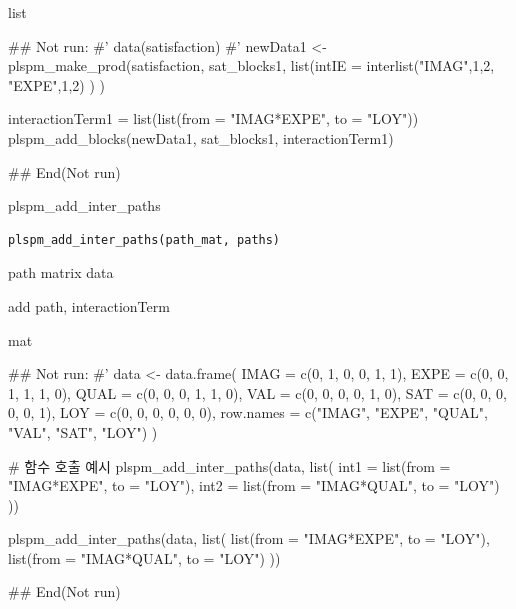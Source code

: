 \documentclass[a4paper]{book}
\begin{document}
%
\begin{Value}
list
\end{Value}
%
\begin{Examples}
\begin{ExampleCode}
## Not run: 
#' data(satisfaction)
#'
newData1 <- plspm_make_prod(satisfaction, sat_blocks1,
                            list(intIE = interlist("IMAG",1,2, "EXPE",1,2) ) )


interactionTerm1 = list(list(from = "IMAG*EXPE", to = "LOY"))
plspm_add_blocks(newData1, sat_blocks1, interactionTerm1)


## End(Not run)

\end{ExampleCode}
\end{Examples}
%
\begin{Description}
plspm\_add\_inter\_paths
\end{Description}
%
\begin{Usage}
\begin{verbatim}
plspm_add_inter_paths(path_mat, paths)
\end{verbatim}
\end{Usage}
%
\begin{Arguments}
\begin{ldescription}
\item[\code{path\_mat}] path matrix data

\item[\code{paths}] add path, interactionTerm
\end{ldescription}
\end{Arguments}
%
\begin{Value}
mat
\end{Value}
%
\begin{Examples}
\begin{ExampleCode}


## Not run: 
#'
data <- data.frame(
  IMAG = c(0, 1, 0, 0, 1, 1),
  EXPE = c(0, 0, 1, 1, 1, 0),
  QUAL = c(0, 0, 0, 1, 1, 0),
  VAL  = c(0, 0, 0, 0, 1, 0),
  SAT  = c(0, 0, 0, 0, 0, 1),
  LOY  = c(0, 0, 0, 0, 0, 0),
  row.names = c("IMAG", "EXPE", "QUAL", "VAL", "SAT", "LOY")
)

# 함수 호출 예시
plspm_add_inter_paths(data, list(
  int1 = list(from = "IMAG*EXPE", to = "LOY"),
  int2 = list(from = "IMAG*QUAL", to = "LOY")
))

plspm_add_inter_paths(data, list(
  list(from = "IMAG*EXPE", to = "LOY"),
  list(from = "IMAG*QUAL", to = "LOY")
))



## End(Not run)


\end{ExampleCode}
\end{Examples}
\end{document}

